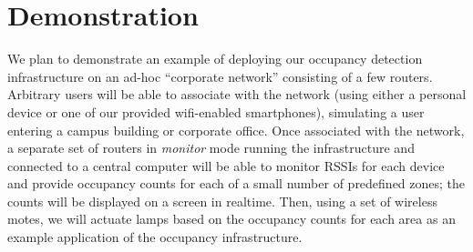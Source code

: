 \section{Demonstration}
We plan to demonstrate an example of deploying our occupancy detection infrastructure on an ad-hoc ``corporate network'' consisting of a few routers. Arbitrary users will be able to associate with the network (using either a personal device or one of our provided wifi-enabled smartphones), simulating a user entering a campus building or corporate office. Once associated with the network, a separate set of routers in \emph{monitor} mode running the infrastructure and connected to a central computer will be able to monitor RSSIs for each device and provide occupancy counts for each of a small number of predefined zones; the counts will be displayed on a screen in realtime. Then, using a set of wireless motes, we will actuate lamps based on the occupancy counts for each area as an example application of the occupancy infrastructure.